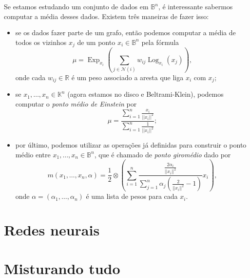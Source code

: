 \documentclass{article}
\DeclareMathOperator{\Exp}{Exp}
\DeclareMathOperator{\Log}{Log}
\begin{document}
Se estamos estudando um conjunto de dados em $\mathbb{B}^n$, é interessante sabermos computar a média desses dados. Existem três maneiras de fazer isso: \begin{itemize}
    \item se os dados fazer parte de um grafo, então podemos computar a média de todos os vizinhos $x_j$ de um ponto $x_i \in \mathbb{B}^n$ pela fórmula \begin{equation}
        \mu = \Exp_{x_i}\left(\sum_{j \in \mathcal{N}(i)} w_{ij} \Log_{x_i}(x_j)\right),
    \end{equation} onde cada $w_{ij} \in \mathbb{R}$ é um peso associado a aresta que liga $x_i$ com $x_j$;

    \item se $x_1, \dots, x_n \in \mathbb{K}^n$ (agora estamos no disco e Beltrami-Klein), podemos computar o \textit{ponto médio de Einstein} por \begin{equation}
        \mu = \frac{\sum_{i = 1}^n \frac{x_i}{||x_i||^2}}{\sum_{i = 1}^n \frac{1}{||x_i||^2}};
    \end{equation}

    \item por último, podemos utilizar as operações já definidas para construir o ponto médio entre $x_1, \dots, x_n \in \mathbb{B}^n$, que é chamado de \textit{ponto giromédio} dado por \begin{equation}
        m(x_1, \dots, x_n, \alpha) = \frac{1}{2} \otimes \left(\sum_{i = 1}^n \frac{\frac{2\alpha_i}{||x_i||^2}}{\sum_{j = 1}^n \alpha_j\left(\frac{2}{||x_i||^2} - 1\right)}x_i\right),
    \end{equation} onde $\alpha = (\alpha_1, \dots, \alpha_n)$ é uma lista de pesos para cada $x_i$.
\end{itemize}

\section{Redes neurais}

\section{Misturando tudo}

\nocite{*}
\printbibliography
\end{document}
